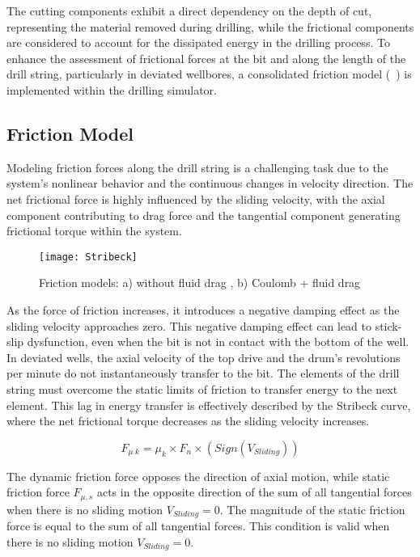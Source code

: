 The cutting components exhibit a direct dependency on the depth of cut, representing the material removed during drilling, while the frictional components are considered to account for the dissipated energy in the drilling process. To enhance the assessment of frictional forces at the bit and along the length of the drill string, particularly in deviated wellbores, a consolidated friction model (~\cite{ref:cayeux2020a}) is implemented within the drilling simulator. 

\subsection{Friction Model}

Modeling friction forces along the drill string is a challenging task due to the system's nonlinear behavior and the continuous changes in velocity direction. The net frictional force is highly influenced by the sliding velocity, with the axial component contributing to drag force and the tangential component generating frictional torque within the system.
 
\begin{figure}
  \centering
  \texttt{[image: Stribeck]}
  \caption[Comparison of friction models]{Friction models: a) without fluid drag\footnotemark{} , b) Coulomb + fluid drag\footnotemark{\value{drag}}   ~\cite{ref:cayeux2020a}}\label{Friction models}
\end{figure}

As the force of friction increases, it introduces a negative damping effect as the sliding velocity approaches zero. This negative damping effect can lead to stick-slip dysfunction, even when the bit is not in contact with the bottom of the well. In deviated wells, the axial velocity of the top drive and the drum's revolutions per minute do not instantaneously transfer to the bit. The elements of the drill string must overcome the static limits of friction to transfer energy to the next element. This lag in energy transfer is effectively described by the Stribeck curve, where the net frictional torque decreases as the sliding velocity increases.

\begin{equation}\label{dyanmic_force}
  F_{\mu\; k} = \mu_{k}\times F_{n} \times (Sign(V_{Sliding}))
\end{equation}

The dynamic friction force opposes the direction of axial motion, while static friction force $F_{\mu,s}$ acts in the opposite direction of the sum of all tangential forces when there is no sliding motion $V_{Sliding}=0$. The magnitude of the static friction force is equal to the sum of all tangential forces. This condition is valid when there is no sliding motion $V_{Sliding}=0$.

